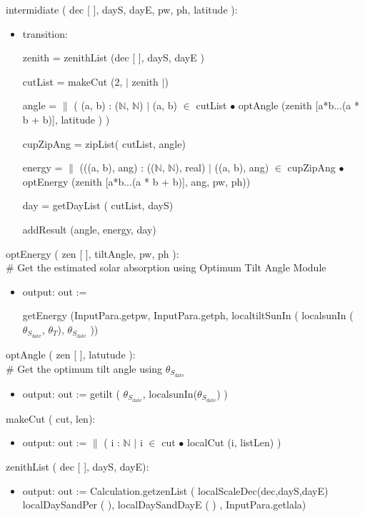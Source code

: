\documentclass[12pt, titlepage]{article}
\begin{document}
\noindent  intermidiate ( dec [ ], dayS, dayE, pw, ph, latitude ):
\begin{itemize}
\item transition:

zenith = zenithList (dec [ ], dayS, dayE )

cutList = makeCut (2, $|$ zenith $|$)

angle = $\|$ ( (a, b) : ($\mathbb{N}$, $\mathbb{N}$) $|$ (a, b) $\in$ cutList $\bullet	$  optAngle (zenith [a*b...(a * b + b)], latitude ) )

cupZipAng = zipList( cutList, angle)

energy = $\|$ (((a, b), ang) : (($\mathbb{N}$, $\mathbb{N}$), real) $|$ ((a, b), ang)  $\in$ cupZipAng $\bullet	$ optEnergy (zenith [a*b...(a * b + b)], ang, pw, ph))

day = getDayList ( cutList, dayS)

addResult (angle, energy,  day)

\end{itemize}

\noindent  optEnergy ( zen [ ], tiltAngle, pw, ph ):\\
$\#$ Get the estimated solar absorption using Optimum Tilt Angle Module\\
\begin{itemize}
\item output: out :=

 getEnergy (InputPara.getpw, InputPara.getph, localtiltSunIn ( localsunIn ($\theta_{S_{\text{date}}}$, $\theta_{T}$), $\theta_{S_{\text{date}}}$ ))\\
\end{itemize}


\noindent  optAngle ( zen [ ], latutude ):\\
$\#$ Get the optimum tilt angle using $\theta_{S_{\text{date}}}$\\
\begin{itemize}
\item output: out :=
 getilt ( $\theta_{S_{\text{date}}}$, localsunIn($\theta_{S_{\text{date}}}$) )\\
\end{itemize}

\noindent  makeCut ( cut, len):
\begin{itemize}
\item output: out := $\|$ ( i : $\mathbb{N}$ $|$ i $\in$ cut $\bullet$	 localCut (i, listLen) )
\end{itemize}

\noindent  zenithList ( dec [ ], dayS, dayE):
\begin{itemize}
\item output: out :=
 Calculation.getzenList ( localScaleDec(dec,dayS,dayE)   localDaySandPer ( ),  localDaySandDayE ( ) , InputPara.getlala)\\
\end{itemize}
\end{document}
